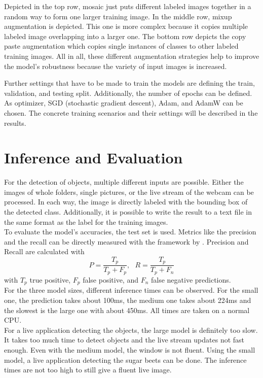 Depicted in the top row, mosaic just puts different labeled images together in a random way to form one larger training image. In the middle row, mixup augmentation is depicted. This one is more complex because it copies multiple labeled image overlapping into a larger one. The bottom row depicts the copy paste augmentation which copies single instances of classes to other labeled training images. All in all, these different augmentation strategies help to improve the model's robustness because the variety of input images is increased. 

Further settings that have to be made to train the models are defining the train, validation, and testing split. Additionally, the number of epochs can be defined. As optimizer, SGD (stochastic gradient descent), Adam, and AdamW can be chosen. The concrete training scenarios and their settings will be described in the results. 

\section{Inference and Evaluation}
For the detection of objects, multiple different inputs are possible. Either the images of whole folders, single pictures, or the live stream of the webcam can be processed. In each way, the image is directly labeled with the bounding box of the detected class. Additionally, it is possible to write the result to a text file in the same format as the label for the training images. \\

To evaluate the model's accuracies, the test set is used. Metrics like the precision and the recall can be directly measured with the framework by \cite{yolov5}. Precision and Recall are calculated with  
\begin{equation}
P = \frac{T_p}{T_p + F_p},\textrm{ } R = \frac{T_p}{T_p + F_n} 
\end{equation} 
with $ T_p $ true positive, $ F_p $ false positive, and $ F_n $ false negative predictions.\\

For the three model sizes, different inference times can be observed. For the small one, the prediction takes about 100ms, the medium one takes about 224ms and the slowest is the large one with about 450ms. All times are taken on a normal CPU. \\

For a live application detecting the objects, the large model is definitely too slow. It takes too much time to detect objects and the live stream updates not fast enough. Even with the medium model, the window is not fluent. Using the small model, a live application detecting the sugar beets can be done. The inference times are not too high to still give a fluent live image. \\

